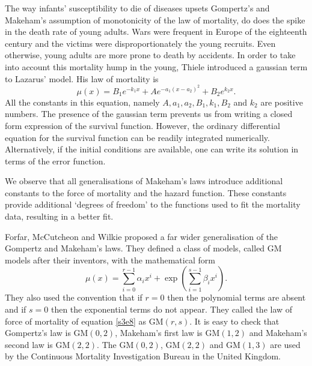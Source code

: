 \documentclass{article}
\numberwithin{equation}{section}
\begin{document}
The way infants' susceptibility to die of diseases upsets Gompertz's and 
Makeham's assumption of monotonicity of the law of mortality, do does the 
spike in the death rate of young adults. Wars were frequent in Europe of the 
eighteenth century and the victims were disproportionately the young recruits.
Even otherwise, young adults are more prone to death by accidents. In order
to take into account this mortality hump in the young, Thiele 
\cite{thiele1871mathematical} introduced a gaussian term to Lazarus' model.
His law of mortality is
\begin{equation}\label{s3e7}
\mu(x) = B_1 e^{-k_1x} + Ae^{-a_1(x - a_2)^2} + B_2e^{k_2 x}.
\end{equation}
All the constants in this equation, namely $A, a_1, a_2, B_1, k_1, B_2$ and 
$k_2$ are positive numbers. The presence of the gaussian term prevents us
from writing a closed form expression of the survival function. However, the
ordinary differential equation for the survival function can be readily 
integrated numerically. Alternatively, if the initial conditions are available,
one can write its solution in terms of the error function.

We observe that all generalisations of Makeham's laws introduce additional
constants to the force of mortality and the hazard function. These constants
provide additional `degrees of freedom' to the functions used to fit the 
mortality data, resulting in a better fit.

Forfar, McCutcheon and Wilkie proposed a far wider generalisation of the
Gompertz and Makeham's laws. They defined a class of models, called GM models
after their inventors, with the mathematical form
\begin{equation}\label{s3e8}
\mu(x) = \sum_{i=0}^{r-1}\alpha_i x^i + 
\exp\left(\sum_{i=1}^{s-1}\beta_i x^i\right).
\end{equation}
They also used the convention that if $r = 0$ then the polynomial terms are 
absent and if $s = 0$ then the exponential terms do not appear. They called
the law of force of mortality of equation \eqref{s3e8} as $\mathrm{GM}(r,s)$.
It is easy to check that Gompertz's law is $\mathrm{GM}(0, 2)$, Makeham's
first law is $\mathrm{GM}(1,2)$ and Makeham's second law is $\mathrm{GM}(2,2)$.
The $\mathrm{GM}(0, 2)$, $\mathrm{GM}(2,2)$ and $\mathrm{GM}(1,3)$ are used
by the Continuous Mortality Investigation Bureau\cite{pitacco2016high} in the 
United Kingdom.
\end{document}
